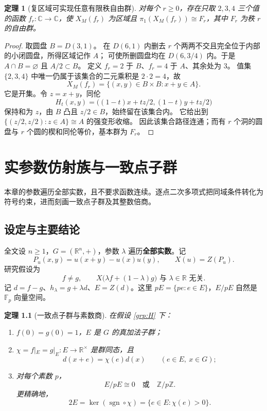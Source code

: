 \documentclass[11pt,a4paper,oneside,openany]{book}
\theoremstyle{lecture}
\newtheorem{theorem}{定理}[section]
\newcommand{\R}{\mathbb R}
\newcommand{\C}{\mathbb C}
\newcommand{\Z}{\mathbb Z}
\newcommand{\Fp}{\mathbb F_p}
\newcommand{\sgn}{\operatorname{sgn}}
\numberwithin{equation}{section}
\begin{document}
\begin{theorem}[复区域可实现任意有限秩自由群]
对每个 $r\ge0$，存在只取 $2,3,4$ 三个值的函数 $f_r:\C\to\C$，使 $X_M(f_r)$ 为区域且
$\pi_1(X_M(f_r))\cong F_r$，其中 $F_r$ 为秩 $r$ 的自由群。
\end{theorem}
\begin{proof}
取圆盘 $B=D(3,1)$。
在 $D(6,1)$ 内删去 $r$ 个两两不交且完全位于内部的小闭圆盘，所得区域记作 $A$；
可使所删圆盘均在 $D(6,3/4)$ 内。于是 $A\cap B=\varnothing$ 且 $A/2\subset B$。
定义 $f_r=2$ 于 $B$、$f_r=4$ 于 $A$、其余处为 $3$。
值集 $\{2,3,4\}$ 中唯一仍属于该集合的二元乘积是 $2\cdot2=4$，故
\[
 X_M(f_r)=\{(x,y)\in B\times B:x+y\in A\}.
\]
它是开集。令 $z=x+y$，同伦
\[
 H_t(x,y)=\bigl((1-t)x+tz/2,(1-t)y+tz/2\bigr)
\]
保持和为 $z$，由 $B$ 凸且 $z/2\in B$，始终留在该集合内。
它给出到 $\{(z/2,z/2):z\in A\}\cong A$ 的强变形收缩。
因此该集合路径连通；而有 $r$ 个洞的圆盘与 $r$ 个圆的楔和同伦等价，基本群为 $F_r$。
\end{proof}


\chapter{实参数仿射族与一致点子群}\label{ch:affine}
本章的参数遍历全部实数，且不要求函数连续。逐点二次多项式把同域条件转化为符号约束，进而刻画一致点子群及其整数倍商。
\section{设定与主要结论}

全文设 $n\ge1$，$G=(\R^n,+)$，参数 $\lambda$ 遍历\textbf{全部实数}。记
\[
 P_u(x,y)=u(x+y)-u(x)u(y),\qquad X(u)=Z(P_u).
\]
研究假设为
\begin{equation}\label{grp:H}
 f\ne g,\qquad X\bigl(\lambda f+(1-\lambda)g\bigr)
 \text{ 与 }\lambda\in\R\text{ 无关}.
\end{equation}
记 $d=f-g$、$h_\lambda=g+\lambda d$、$E=Z(d)$。这里
$pE=\{pe:e\in E\}$，$E/pE$ 自然是 $\Fp$ 向量空间。

\begin{theorem}[一致点子群与素数商]\label{grp:main}
在假设 \eqref{grp:H} 下：
\begin{enumerate}
\item $f(0)=g(0)=1$，$E$ 是 $G$ 的真加法子群；
\item $\chi=f|_E=g|_E:E\to\R^\times$ 是群同态，且
\begin{equation}\label{grp:covariance}
 d(x+e)=\chi(e)d(x)\qquad(e\in E,\ x\in G);
\end{equation}
\item 对每个素数 $p$，
\begin{equation}\label{grp:primeclass}
 \boxed{\quad E/pE\cong 0\quad\text{或}\quad\Z/p\Z.\quad}
\end{equation}
更精确地，
\begin{equation}\label{grp:signclass}
 2E=\ker(\sgn\circ\chi)=\{e\in E:\chi(e)>0\}.
\end{equation}
\end{enumerate}
\end{theorem}
\end{document}
